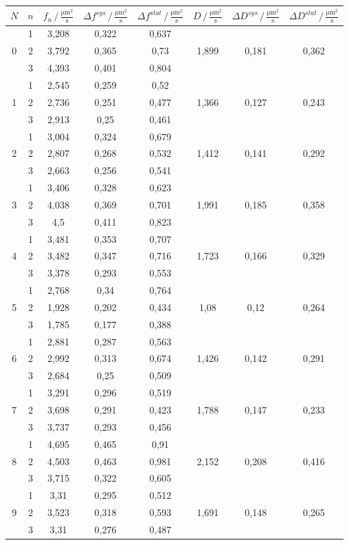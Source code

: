 \documentclass[a4paper,12pt]{article}
\begin{document}
\begin{table}[h!]
\centering
\begin{tabular}{c|c|c|c|c|c|c|c}
$N$&$n$&$f_n\,/\,\frac{\mathrm{\mu m}^2}{\mathrm{s}}$&$\Delta f^{sys}\,/\,\frac{\mathrm{\mu m}^2}{\mathrm{s}}$&$\Delta f^{stat}\,/\,\frac{\mathrm{\mu m}^2}{\mathrm{s}}$&$D\,/\,\frac{\mathrm{\mu m}^2}{\mathrm{s}}$&$\Delta D^{sys}\,/\,\frac{\mathrm{\mu m}^2}{\mathrm{s}}$&$\Delta D^{stat}\,/\,\frac{\mathrm{\mu m}^2}{\mathrm{s}}$ \\ \hline
 &1 &3,208 &0,322 &0,637 & & & \\ 
0 &2 &3,792 &0,365 &0,73 &1,899 &0,181 &0,362 \\ 
 &3 &4,393 &0,401 &0,804 & & & \\ \hline
 &1 &2,545 &0,259 &0,52 & & & \\ 
1 &2 &2,736 &0,251 &0,477 &1,366 &0,127 &0,243 \\ 
 &3 &2,913 &0,25 &0,461 & & & \\ \hline
  &1 &3,004 &0,324 &0,679  & & &\\ 
2 &2 &2,807 &0,268 &0,532 &1,412 &0,141 &0,292 \\ 
 &3 &2,663 &0,256 &0,541 & & & \\ \hline
  &1 &3,406 &0,328 &0,623 & & & \\ 
3 &2 &4,038 &0,369 &0,701 &1,991 &0,185 &0,358 \\ 
 &3 &4,5 &0,411 &0,823 & & & \\ \hline
  &1 &3,481 &0,353 &0,707 & & & \\ 
4 &2 &3,482 &0,347 &0,716 &1,723 &0,166 &0,329 \\ 
 &3 &3,378 &0,293 &0,553 & & & \\ \hline
  &1 &2,768 &0,34 &0,764 & & & \\ 
5 &2 &1,928 &0,202 &0,434 &1,08 &0,12 &0,264 \\ 
 &3 &1,785 &0,177 &0,388 & & & \\ \hline
  &1 &2,881 &0,287 &0,563 & & &\\ 
6 &2 &2,992 &0,313 &0,674 &1,426 &0,142 &0,291 \\ 
 &3 &2,684&0,25 &0,509 & & & \\ \hline
  &1 &3,291 &0,296 &0,519 & & &\\ 
7 &2 &3,698 &0,291 &0,423 &1,788 &0,147 &0,233 \\ 
 &3 &3,737 &0,293 &0,456 & & & \\ \hline
  &1 &4,695 &0,465 &0,91 & & &\\ 
8 &2 &4,503 &0,463 &0,981 &2,152 &0,208 &0,416 \\ 
 &3 &3,715 &0,322 & 0,605& & & \\ \hline
  &1 &3,31 &0,295 &0,512 & & & \\ 
9 &2 &3,523 &0,318 &0,593 &1,691 &0,148 &0,265 \\ 
 &3 &3,31 &0,276 &0,487 & & & \\
\end{tabular}
\end{table}\\
\end{document}
